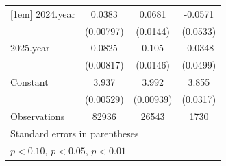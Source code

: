 \begin{table}[htbp]
\begin{tabular}{l*{3}{c}}
[1em]
2024.year           &      0.0383\sym{***}&      0.0681\sym{***}&     -0.0571         \\
                    &   (0.00797)         &    (0.0144)         &    (0.0533)         \\
[1em]
2025.year           &      0.0825\sym{***}&       0.105\sym{***}&     -0.0348         \\
                    &   (0.00817)         &    (0.0146)         &    (0.0499)         \\
[1em]
Constant            &       3.937\sym{***}&       3.992\sym{***}&       3.855\sym{***}\\
                    &   (0.00529)         &   (0.00939)         &    (0.0317)         \\
\hline
Observations        &       82936         &       26543         &        1730         \\
\hline\hline
\multicolumn{4}{l}{\footnotesize Standard errors in parentheses}\\
\multicolumn{4}{l}{\footnotesize \sym{*} \(p<0.10\), \sym{**} \(p<0.05\), \sym{***} \(p<0.01\)}\\
\end{tabular}
\end{table}
